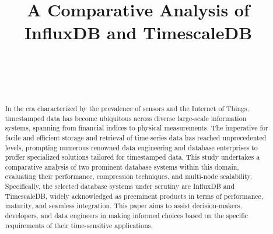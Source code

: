 \documentclass[conference]{IEEEtran}
\begin{document}
\title{A Comparative Analysis of InfluxDB and TimescaleDB\\}

\author{
\\

\\

\\
}


\maketitle

\begin{abstract}
In the era characterized by the prevalence of sensors and the Internet of Things, timestamped data has become ubiquitous across diverse large-scale information systems, spanning from financial indices to physical measurements. The imperative for facile and efficient storage and retrieval of time-series data has reached unprecedented levels, prompting numerous renowned data engineering and database enterprises to proffer specialized solutions tailored for timestamped data. This study undertakes a comparative analysis of two prominent database systems within this domain, evaluating their performance, compression techniques, and multi-node scalability. Specifically, the selected database systems under scrutiny are InfluxDB and TimescaleDB, widely acknowledged as preeminent products in terms of performance, maturity, and seamless integration. This paper aims to assist decision-makers, developers, and data engineers in making informed choices based on the specific requirements of their time-sensitive applications.
\end{abstract}
\end{document}
